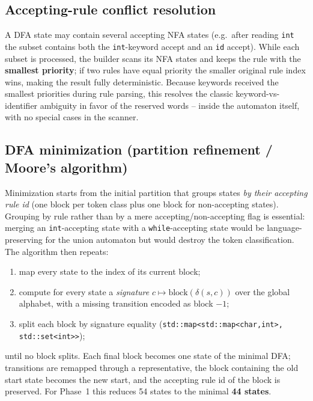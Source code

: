 \documentclass[11pt,a4paper]{article}
\begin{document}
\subsection{Accepting-rule conflict resolution}
A DFA state may contain several accepting NFA states (e.g.\ after reading
\texttt{int} the subset contains both the \texttt{int}-keyword accept and an
\texttt{id} accept). While each subset is processed, the builder scans its NFA
states and keeps the rule with the \textbf{smallest priority}; if two rules have
equal priority the smaller original rule index wins, making the result fully
deterministic. Because keywords received the smallest priorities during rule
parsing, this resolves the classic keyword-vs-identifier ambiguity in favor of
the reserved words -- inside the automaton itself, with no special cases in the
scanner.

\subsection{DFA minimization (partition refinement / Moore's algorithm)}
Minimization starts from the initial partition that groups states \emph{by their
accepting rule id} (one block per token class plus one block for
non-accepting states). Grouping by rule rather than by a mere
accepting/non-accepting flag is essential: merging an \texttt{int}-accepting
state with a \texttt{while}-accepting state would be language-preserving for the
union automaton but would destroy the token classification. The algorithm then
repeats:
\begin{enumerate}
    \item map every state to the index of its current block;
    \item compute for every state a \emph{signature}
          $c \mapsto \text{block}(\delta(s,c))$ over the global alphabet, with a
          missing transition encoded as block $-1$;
    \item split each block by signature equality
          (\texttt{std::map<std::map<char,int>, std::set<int>>});
\end{enumerate}
until no block splits. Each final block becomes one state of the minimal DFA;
transitions are remapped through a representative, the block containing the old
start state becomes the new start, and the accepting rule id of the block is
preserved. For Phase~1 this reduces 54 states to the minimal \textbf{44 states}.
\end{document}
